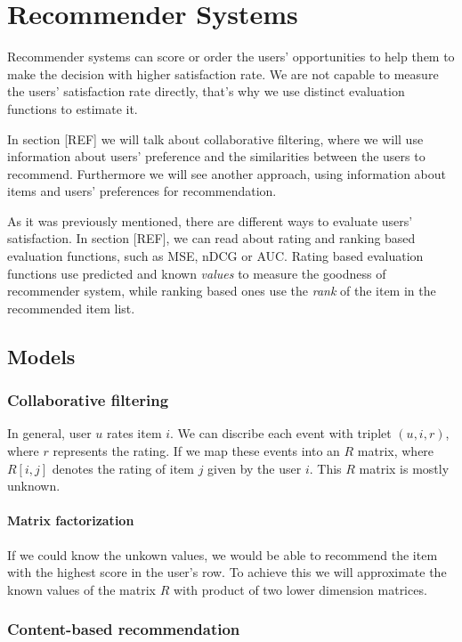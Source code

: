 \chapter{Recommender Systems}
Recommender systems can score or order the users' opportunities to help them to
make the decision with higher satisfaction rate. We are not capable to measure
the users' satisfaction rate directly, that's why we use distinct evaluation 
functions to estimate it.

In section [REF] we will talk about collaborative filtering, where we will use
information about users' preference and the similarities between the users to
recommend. Furthermore we will see another approach, using information about
items and users' preferences for recommendation.

As it was previously mentioned, there are different ways to evaluate users' 
satisfaction. In section [REF], we can read about rating and ranking based
 evaluation functions, such as MSE, nDCG or AUC. Rating based evaluation 
functions use predicted and known \emph{values} to measure the goodness of
 recommender system, while ranking based ones use the \emph{rank} of the item in
 the recommended item list.

\section{Models}
\subsection{Collaborative filtering}
In general, user $u$ rates item $i$. We can discribe each event with triplet
$(u, i, r)$, where $r$ represents the rating. If we map these events into an $R$
matrix, where $R[i,j]$ denotes the rating of item $j$ given by the user $i$. This
$R$ matrix is mostly unknown.

\subsubsection{Matrix factorization}
If we could know the unkown values, we would be able to recommend the item with the
highest score in the user's row. To achieve this we will approximate the known values of
the matrix $R$ with product of two lower dimension matrices. 

 
\subsection{Content-based recommendation}

